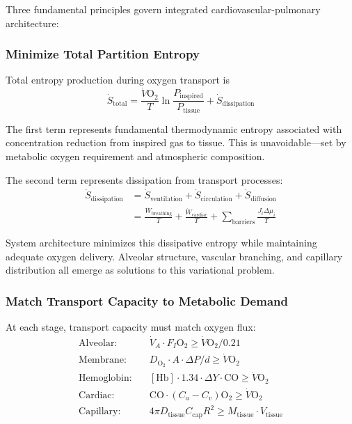 \documentclass[12pt,a4paper]{article}
\theoremstyle{remark}
\begin{document}
Three fundamental principles govern integrated cardiovascular-pulmonary architecture:

\subsubsection{Minimize Total Partition Entropy}

Total entropy production during oxygen transport is
\begin{equation}
\dot{S}_{\mathrm{total}} = \frac{\dot{V}\mathrm{O}_{2}}{T}\ln\frac{P_{\mathrm{inspired}}}{P_{\mathrm{tissue}}} + \dot{S}_{\mathrm{dissipation}}
\end{equation}

The first term represents fundamental thermodynamic entropy associated with concentration reduction from inspired gas to tissue. This is unavoidable—set by metabolic oxygen requirement and atmospheric composition.

The second term represents dissipation from transport processes:
\begin{align}
\dot{S}_{\mathrm{dissipation}} &= \dot{S}_{\mathrm{ventilation}} + \dot{S}_{\mathrm{circulation}} + \dot{S}_{\mathrm{diffusion}} \\
&= \frac{\dot{W}_{\mathrm{breathing}}}{T} + \frac{\dot{W}_{\mathrm{cardiac}}}{T} + \sum_{\mathrm{barriers}} \frac{J_{i}\Delta\mu_{i}}{T}
\end{align}

System architecture minimizes this dissipative entropy while maintaining adequate oxygen delivery. Alveolar structure, vascular branching, and capillary distribution all emerge as solutions to this variational problem.

\subsubsection{Match Transport Capacity to Metabolic Demand}

At each stage, transport capacity must match oxygen flux:
\begin{align}
\text{Alveolar:} \quad &\dot{V}_{A} \cdot F_{I}\mathrm{O}_{2} \geq \dot{V}\mathrm{O}_{2}/0.21 \\
\text{Membrane:} \quad &D_{\mathrm{O}_{2}} \cdot A \cdot \Delta P/d \geq \dot{V}\mathrm{O}_{2} \\
\text{Hemoglobin:} \quad &[\mathrm{Hb}] \cdot 1.34 \cdot \Delta Y \cdot \mathrm{CO} \geq \dot{V}\mathrm{O}_{2} \\
\text{Cardiac:} \quad &\mathrm{CO} \cdot (C_{a} - C_{v})\mathrm{O}_{2} \geq \dot{V}\mathrm{O}_{2} \\
\text{Capillary:} \quad &4\pi D_{\mathrm{tissue}} C_{\mathrm{cap}} R^{2} \geq M_{\mathrm{tissue}} \cdot V_{\mathrm{tissue}}
\end{align}
\end{document}
